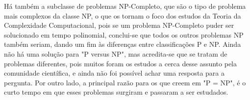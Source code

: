 \documentclass[12pt]{article}
\begin{document}
	
	Há também a subclasse de problemas NP-Completo, que são o tipo de problema mais complexos da classe NP, o que os tornam o foco dos estudos da Teoria da Complexidade Computacional, pois se um problema NP-Completo puder ser solucionado em tempo polinomial, conclui-se que todos os outros problemas NP também seriam, dando um fim às diferenças entre classificações P e NP. Ainda não há uma solução para "P versus NP", mas acredita-se que se tratam de problemas diferentes, pois muitos foram os estudos a cerca desse assunto pela comunidade científica, e ainda não foi possível achar uma resposta para a pergunta. Por outro lado, a principal razão para os que creem em "P = NP", é o curto tempo em que esses problemas surgiram e passaram a ser estudados. 
	

	
	
	
	
	
\end{document}

